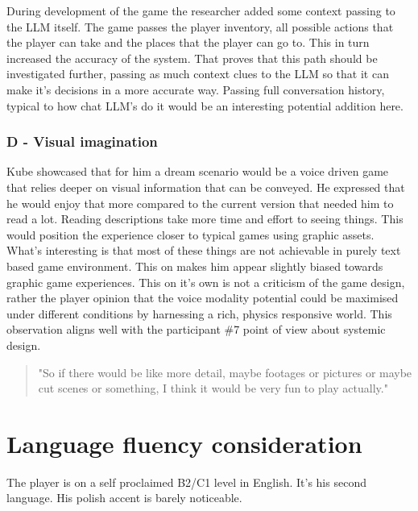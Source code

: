During development of the game the researcher added some context passing to the LLM itself. The game passes the player inventory, all possible actions that the player can take and the places that the player can go to. This in turn increased the accuracy of the system. 
That proves that this path should be investigated further, passing as much context clues to the LLM so that it can make it's decisions in a more accurate way. Passing full conversation history, typical to how chat LLM's do it would be an interesting potential addition here.


\subsubsection{D - Visual imagination}

Kube showcased that for him a dream scenario would be a voice driven game that relies deeper on visual information that can be conveyed. He expressed that he would enjoy that more compared to the current version that needed him to read a lot. Reading descriptions take more time and effort to seeing things. This would position the experience closer to typical games using graphic assets. What's interesting is that most of these things are not achievable in purely text based game environment. This on makes him appear slightly biased towards graphic game experiences. This on it's own is not a criticism of the game design, rather the player opinion that the voice modality potential could be maximised under different conditions by harnessing a rich, physics responsive world. This observation aligns well with the participant \#7 point of view about systemic design. 

\begin{quote}
    "So if there would be like more detail, maybe footages or pictures or maybe cut scenes or something, I think it would be very fun to play actually."
\end{quote}



\section{Language fluency consideration}


The player is on a self proclaimed B2/C1 level in English. It's his second language. His polish accent is barely noticeable.
